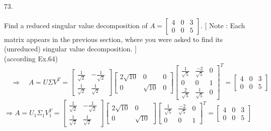 \documentclass[12pt]{book}
\newcounter{sect}
\begin{document}
\begin{CJK}{UTF8}{bsmi}
73. \begin{minipage}[t]{\dimexpr\linewidth-2em}
Find a reduced singular value decomposition of $A=\begin{bmatrix}
4&0&3\\0&0&5
\end{bmatrix}$. [ Note : Each matrix appears in the previous section, where you were asked to find its (unreduced) singular value decomposition. ] \\
(according Ex.64)$\quad\displaystyle\Rightarrow\quad A=U\Sigma V^T=\begin{bmatrix}
\frac{1}{\sqrt{2}} & -\frac{1}{\sqrt{2}} \\ 
\frac{1}{\sqrt{2}} & \frac{1}{\sqrt{2}}
\end{bmatrix}\begin{bmatrix}
2\sqrt{10} & 0 & 0 \\
0 & \sqrt{10} & 0
\end{bmatrix}\begin{bmatrix}
\frac{1}{\sqrt{5}} & \frac{-2}{\sqrt{5}} & 0 \\
0 & 0 & 1 \\
\frac{2}{\sqrt{5}} & \frac{1}{\sqrt{5}} & 0
\end{bmatrix}^T=\begin{bmatrix}
4&0&3\\0&0&5
\end{bmatrix}$ \\
$\displaystyle\Rightarrow A=U_1\Sigma_1 V^T_1=\begin{bmatrix}
\frac{1}{\sqrt{2}} & -\frac{1}{\sqrt{2}} \\ 
\frac{1}{\sqrt{2}} & \frac{1}{\sqrt{2}}
\end{bmatrix}\begin{bmatrix}
2\sqrt{10} & 0 \\
0 & \sqrt{10}
\end{bmatrix}\begin{bmatrix}
\frac{1}{\sqrt{5}} & \frac{-2}{\sqrt{5}} & 0 \\
0 & 0 & 1
\end{bmatrix}^T=\begin{bmatrix}
4&0&3\\0&0&5
\end{bmatrix}$

\end{minipage}\\


\end{CJK}
\end{document}

